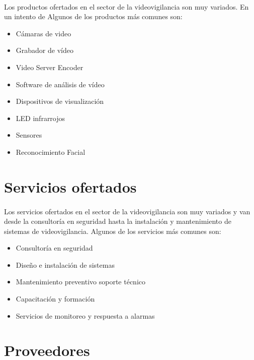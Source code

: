 \documentclass{report}
\begin{document}
        \paragraph*{}
        {
          Los productos ofertados en el sector de la videovigilancia son muy variados.
          En un intento de 
          Algunos de los productos más comunes son: \cite{wiki-videovigilancia-ip}
        }
        \begin{multicols}{2}
          \begin{itemize}
            \item Cámaras de video
            \item Grabador de vídeo 
            \item Video Server Encoder
            \item Software de análisis de vídeo
            \item Dispositivos de visualización
            \item LED infrarrojos
            \item Sensores
            \item Reconocimiento Facial
          \end{itemize}
        \end{multicols}
      \section{Servicios ofertados}
        \paragraph*{}
        {
          Los servicios ofertados en el sector de la videovigilancia son muy variados y van desde la consultoría en seguridad hasta la instalación y mantenimiento de sistemas de videovigilancia. 
          Algunos de los servicios más comunes son: \cite{wiki-videovigilancia-ip}
        }
        \begin{itemize}
          \item Consultoría en seguridad
          \item Diseño e instalación de sistemas
          \item Mantenimiento preventivo soporte técnico
          \item Capacitación y formación
          \item Servicios de monitoreo y respuesta a alarmas
        \end{itemize}
      \section{Proveedores}
\end{document}
